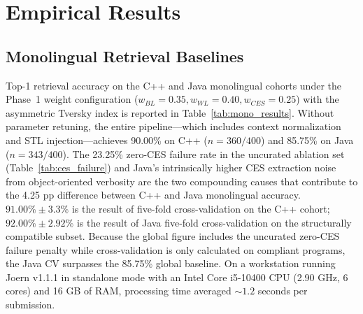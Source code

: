 \section{Empirical Results}
\label{sec:results}

\subsection{Monolingual Retrieval Baselines}
\label{subsec:mono_results}

Top-1 retrieval accuracy on the C++ and Java monolingual cohorts under the Phase~1 weight configuration ($w_{BL}=0.35, w_{WL}=0.40, w_{CES}=0.25$) with the asymmetric Tversky index is reported in Table~\ref{tab:mono_results}. Without parameter retuning, the entire pipeline—which includes context normalization and STL injection—achieves 90.00\% on C++ ($n=360/400$) and 85.75\% on Java ($n=343/400$). The 23.25\% zero-CES failure rate in the uncurated ablation set (Table~\ref{tab:ces_failure}) and Java's intrinsically higher CES extraction noise from object-oriented verbosity are the two compounding causes that contribute to the 4.25 pp difference between C++ and Java monolingual accuracy. $91.00\% \pm 3.3\%$ is the result of five-fold cross-validation on the C++ cohort; $92.00\% \pm 2.92\%$ is the result of Java five-fold cross-validation on the structurally compatible {subset. Because} the global figure includes the uncurated zero-CES failure penalty while cross-validation is only calculated on compliant programs, the Java CV surpasses the 85.75\% global baseline. On a workstation running Joern v1.1.1 in standalone mode with an Intel Core i5-10400 CPU (2.90 GHz, 6 cores) and 16 GB of RAM, processing time averaged ${\sim}1.2$ seconds per submission. 

\begin{table}[ht] 
\caption{Monolingual Retrieval Accuracy. Phase~1 weights ($w_{BL}=0.35, w_{WL}=0.40, w_{CES}=0.25)$ with an asymmetric Tversky index ($\alpha=0.1$, $\beta=0.9$) are used in the results. The final, perfectly balanced 400-program assessment dataset is reflected in the Java monolingual accuracy (85.75\%); the discordant cells of Table~\ref{tab:mcnemar_contingency} are used to calculate the McNemar odds ratio (OR$=b/c=4.875$).}
\label{tab:mono_results}
\centering
{}
\end{table}


